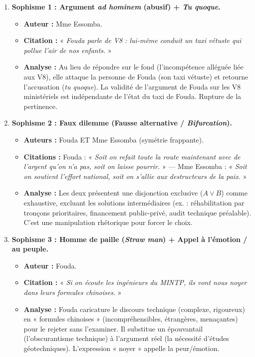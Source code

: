 \documentclass[11pt]{article}
\begin{document}
\begin{exoresolu}
\begin{enumerate}
    \item \textbf{Sophisme 1 : Argument \emph{ad hominem} (abusif) + \emph{Tu quoque}.}
    \begin{itemize}
        \item \textbf{Auteur :} Mme Essomba.
        \item \textbf{Citation :} « \emph{Fouda parle de V8 : lui-même conduit un taxi vétuste qui pollue l'air de nos enfants.} »
        \item \textbf{Analyse :} Au lieu de répondre sur le fond (l'incompétence alléguée liée aux V8), elle attaque la personne de Fouda (son taxi vétuste) et retourne l'accusation (\emph{tu quoque}). La validité de l'argument de Fouda sur les V8 ministériels est indépendante de l'état du taxi de Fouda. Rupture de la pertinence.
    \end{itemize}
    \item \textbf{Sophisme 2 : Faux dilemme (Fausse alternative / \emph{Bifurcation}).}
    \begin{itemize}
        \item \textbf{Auteurs :} Fouda ET Mme Essomba (symétrie frappante).
        \item \textbf{Citations :} Fouda : « \emph{Soit on refait toute la route maintenant avec de l'argent qu'on n'a pas, soit on laisse pourrir.} » --- Mme Essomba : « \emph{Soit on soutient l'effort national, soit on s'allie aux destructeurs de la paix.} »
        \item \textbf{Analyse :} Les deux présentent une disjonction exclusive ($A \lor B$) comme exhaustive, excluant les solutions intermédiaires (ex. : réhabilitation par tronçons prioritaires, financement public-privé, audit technique préalable). C'est une manipulation rhétorique pour forcer le choix.
    \end{itemize}
    \item \textbf{Sophisme 3 : Homme de paille (\emph{Straw man}) + Appel à l'émotion / au peuple.}
    \begin{itemize}
        \item \textbf{Auteur :} Fouda.
        \item \textbf{Citation :} « \emph{Si on écoute les ingénieurs du MINTP, ils vont nous noyer dans leurs formules chinoises.} »
        \item \textbf{Analyse :} Fouda caricature le discours technique (complexe, rigoureux) en « formules chinoises » (incompréhensibles, étrangères, menaçantes) pour le rejeter sans l'examiner. Il substitue un épouvantail (l'obscurantisme technique) à l'argument réel (la nécessité d'études géotechniques). L'expression « noyer » appelle la peur/émotion.

\end{itemize}
\end{enumerate}
\end{exoresolu}
\end{document}
